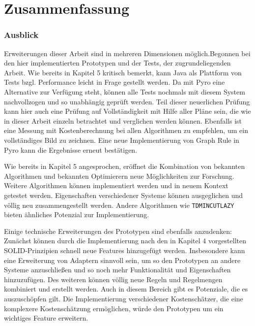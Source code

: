\chapter{Zusammenfassung}




\subsection{Ausblick}



Erweiterungen dieser Arbeit sind in mehreren Dimensionen möglich.Begonnen bei den hier implementierten Prototypen und der Tests, der zugrundeliegenden Arbeit.                                                                                                                                                   Wie bereits in Kapitel 5 kritisch bemerkt, kann Java als Plattform von Tests  bzgl. Performance leicht in Frage gestellt werden. Da mit Pyro eine Alternative zur Verfügung steht, können alle Tests nochmals mit diesem System nachvollzogen und so unabhängig geprüft werden. Teil dieser neuerlichen Prüfung kann hier auch eine Prüfung auf Vollständigkeit mit Hilfe aller Pläne sein, die wie in dieser Arbeit einzeln betrachtet und verglichen werden können. Ebenfalls ist eine Messung mit Kostenberechnung bei allen Algorithmen zu empfehlen, um ein vollständiges Bild zu zeichnen. Eine neue Implementierung von Graph Rule in Pyro kann die Ergebnisse erneut bestätigen.

Wie bereits in Kapitel 5 angesprochen, eröffnet die Kombination von bekannten Algorithmen und bekannten Optimierern neue Möglichkeiten zur Forschung. Weitere Algorithmen können implementiert werden und in neuem Kontext getestet werden. Eigenschaften verschiedener Systeme können ausgeglichen und völlig neu zusammengestellt werden. Andere Algorithmen wie \texttt{TDMINCUTLAZY} bieten ähnliches Potenzial zur Implementierung.

Einige technische Erweiterungen des Prototypen sind ebenfalls anzudenken: Zunächst  können durch die Implementierung nach den in Kapitel 4 vorgestellten SOLID-Prinzipien schnell neue Features hinzugefügt werden. Insbesondere kann eine Erweiterung von Adaptern sinnvoll sein, um so den Prototypen an andere Systeme anzuschließen und so noch mehr Funktionalität und Eigenschaften hinzuzufügen. Des weiteren können völlig neue Regeln und Regelmengen kombiniert und erstellt werden. Auch in diesem Bereich gibt es Potenziale, die es auszuschöpfen gilt. Die Implementierung verschiedener Kostenschätzer, die eine komplexere Kostenschätzung ermöglichen, würde den Prototypen um ein wichtiges Feature erweitern. 

